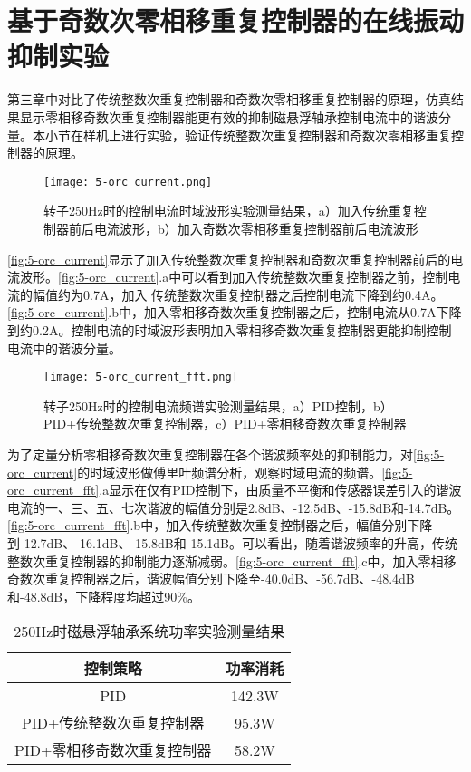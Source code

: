 \documentclass[
  lang=cn,
  degree=master,
  openany,oneside
]{nuaathesis}
\begin{document}
\section{基于奇数次零相移重复控制器的在线振动抑制实验}
第三章中对比了传统整数次重复控制器和奇数次零相移重复控制器的原理，仿真结果显示零相移奇数次重复控制器能更有效的抑制磁悬浮轴承控制电流中的谐波分量。本小节在样机上进行实验，验证传统整数次重复控制器和奇数次零相移重复控制器的原理。

\begin{figure}[h!]
	\texttt{[image: 5-orc\_current.png]}
	\caption{转子250Hz时的控制电流时域波形实验测量结果，a）加入传统重复控制器前后电流波形，b）加入奇数次零相移重复控制器前后电流波形}
	\label{fig:5-orc_current}
\end{figure}

\autoref{fig:5-orc_current}显示了加入传统整数次重复控制器和奇数次重复控制器前后的电流波形。\autoref{fig:5-orc_current}.a中可以看到加入传统整数次重复控制器之前，控制电流的幅值约为0.7A，加入
传统整数次重复控制器之后控制电流下降到约0.4A。\autoref{fig:5-orc_current}.b中，加入零相移奇数次重复控制器之后，控制电流从0.7A下降到约0.2A。控制电流的时域波形表明加入零相移奇数次重复控制器更能抑制控制电流中的谐波分量。

\begin{figure}[h!]
	\texttt{[image: 5-orc\_current\_fft.png]}
	\caption{转子250Hz时的控制电流频谱实验测量结果，a）PID控制，b）PID+传统整数次重复控制器，c）PID+零相移奇数次重复控制器}
	\label{fig:5-orc_current_fft}
\end{figure}

为了定量分析零相移奇数次重复控制器在各个谐波频率处的抑制能力，对\autoref{fig:5-orc_current}的时域波形做傅里叶频谱分析，观察时域电流的频谱。\autoref{fig:5-orc_current_fft}.a显示在仅有PID控制下，由质量不平衡和传感器误差引入的谐波电流的一、三、五、七次谐波的幅值分别是2.8dB、-12.5dB、-15.8dB和-14.7dB。\autoref{fig:5-orc_current_fft}.b中，加入传统整数次重复控制器之后，幅值分别下降到-12.7dB、-16.1dB、-15.8dB和-15.1dB。可以看出，随着谐波频率的升高，传统整数次重复控制器的抑制能力逐渐减弱。\autoref{fig:5-orc_current_fft}.c中，加入零相移奇数次重复控制器之后，谐波幅值分别下降至-40.0dB、-56.7dB、-48.4dB和-48.8dB，下降程度均超过90\%。

\begin{table}[htb]
  \caption[250Hz时磁悬浮轴承系统功率实验测量结果]{250Hz时磁悬浮轴承系统功率实验测量结果\label{tab:amb_power}}
  \begin{tabular}{cc}
    \toprule
    控制策略 & 功率消耗 \\
    \midrule
    PID & 142.3W\\
    PID+传统整数次重复控制器 & 95.3W\\
    PID+零相移奇数次重复控制器 & 58.2W\\
    \bottomrule
  \end{tabular}
\end{table}
\end{document}
